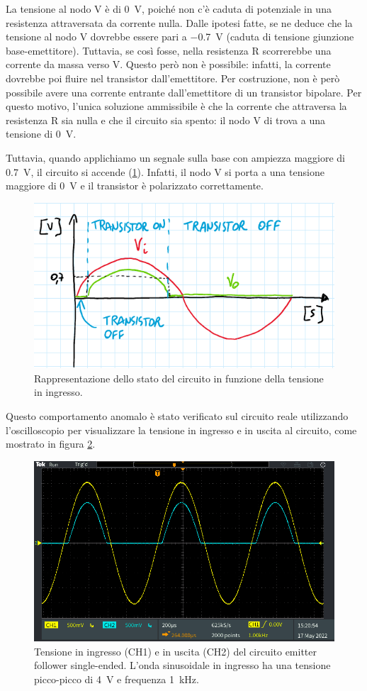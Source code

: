 \noindent
La tensione al nodo V è di \SI{0}{\volt}, poiché non c'è caduta di potenziale in una resistenza attraversata da corrente nulla. Dalle ipotesi fatte, se ne deduce che la tensione al nodo V dovrebbe essere pari a \SI{-0.7}{\volt} (caduta di tensione giunzione base-emettitore). Tuttavia, se così fosse, nella resistenza R scorrerebbe una corrente da massa verso V. Questo però non è possibile: infatti, la corrente dovrebbe poi fluire nel transistor dall'emettitore. Per costruzione, non è però possibile avere una corrente entrante dall'emettitore di un transistor bipolare. Per questo motivo, l'unica soluzione ammissibile è che la corrente che attraversa la resistenza R sia nulla e che il circuito sia spento: il nodo V di trova a una tensione di \SI{0}{\volt}. 

\noindent
Tuttavia, quando applichiamo un segnale sulla base con ampiezza maggiore di \SI{0.7}{\volt}, il circuito si accende (\Fig\ref{fig:emitterfollwer_se_statocircuito}). Infatti, il nodo V si porta a una tensione maggiore di \SI{0}{\volt} e il transistor è polarizzato correttamente.
\begin{figure}[h!]
	\centering
	\includegraphics[width=0.7\linewidth]{./ImageFiles/Laboratorio 2/emitter follower errore soglia}
	\caption{Rappresentazione dello stato del circuito in funzione della tensione in ingresso.}
	\label{fig:emitterfollwer_se_statocircuito}
\end{figure}

\noindent
Questo comportamento anomalo è stato verificato sul circuito reale utilizzando l'oscilloscopio per visualizzare la tensione in ingresso e in uscita al circuito, come mostrato in figura \ref{fig:emitterfollwer_se_errore}.
\begin{figure}[h!]
	\centering
	\includegraphics[width=0.7\linewidth]{./ImageFiles/Laboratorio 2/TEK00020}
	\caption{Tensione in ingresso (CH1) e in uscita (CH2) del circuito emitter follower single-ended. L'onda sinusoidale in ingresso ha una tensione picco-picco di \SI{4}{\volt} e frequenza \SI{1}{\kilo\hertz}.}
	\label{fig:emitterfollwer_se_errore}
\end{figure}

